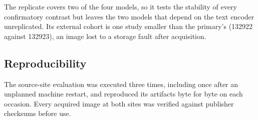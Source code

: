 The replicate covers two of the four models, so it tests the stability of every
confirmatory contrast but leaves the two models that depend on the text encoder
unreplicated. Its external cohort is one study smaller than the primary's
(\num{132922} against \num{132923}), an image lost to a storage fault after
acquisition.

\subsection{Reproducibility}

The source-site evaluation was executed three times, including once after an
unplanned machine restart, and reproduced its artifacts byte for byte on each
occasion. Every acquired image at both sites was verified against publisher
checksums before use.
